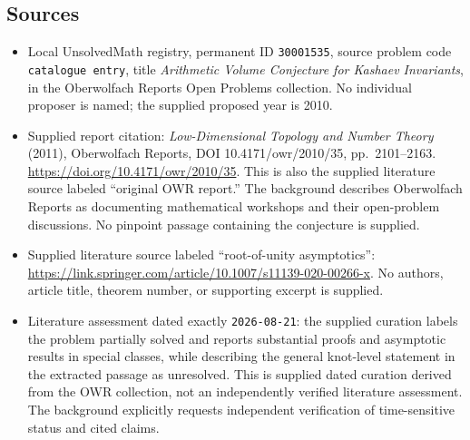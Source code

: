 \documentclass[11pt]{article}
\begin{document}
\subsection{Sources}
\begin{itemize}
\item Local UnsolvedMath registry, permanent ID \texttt{30001535}, source problem code \texttt{catalogue entry}, title \emph{Arithmetic Volume Conjecture for Kashaev Invariants}, in the Oberwolfach Reports Open Problems collection. No individual proposer is named; the supplied proposed year is 2010.
\item Supplied report citation: \emph{Low-Dimensional Topology and Number Theory} (2011), Oberwolfach Reports, DOI 10.4171/owr/2010/35, pp.\ 2101--2163. \url{https://doi.org/10.4171/owr/2010/35}. This is also the supplied literature source labeled ``original OWR report.'' The background describes Oberwolfach Reports as documenting mathematical workshops and their open-problem discussions. No pinpoint passage containing the conjecture is supplied.
\item Supplied literature source labeled ``root-of-unity asymptotics'': \url{https://link.springer.com/article/10.1007/s11139-020-00266-x}. No authors, article title, theorem number, or supporting excerpt is supplied.
\item Literature assessment dated exactly \texttt{2026-08-21}: the supplied curation labels the problem partially solved and reports substantial proofs and asymptotic results in special classes, while describing the general knot-level statement in the extracted passage as unresolved. This is supplied dated curation derived from the OWR collection, not an independently verified literature assessment. The background explicitly requests independent verification of time-sensitive status and cited claims.
\end{itemize}
\end{document}
